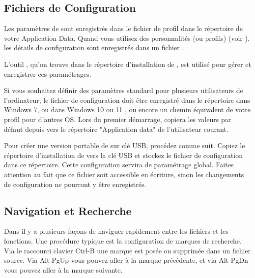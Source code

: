 
\subsection{Fichiers de Configuration}

Les paramètres de \codeblocks sont enregistrés dans le fichier de profil  dans le répertoire  de votre Application Data. Quand vous utilisez des personnalités (ou profils) (voir ), les détails de configuration sont enregistrés dans un fichier .

L'outil , qu'on trouve dans le répertoire d'installation de \codeblocks, est utilisé pour gérer et enregistrer ces paramétrages.

Si vous souhaitez définir des paramètres standard pour plusieurs utilisateurs de l'ordinateur, le fichier de configuration  doit être enregistré dans le répertoire  dans Windows 7, ou dans Windows 10 ou 11 , ou encore un chemin équivalent de votre profil pour d'autres OS. Lors du premier démarrage, \codeblocks copiera les valeurs par défaut depuis   vers le répertoire "Application data" de l'utilisateur courant.

Pour créer une version portable de \codeblocks sur clé USB, procédez comme suit. Copiez le répertoire d'installation de \codeblocks vers la clé USB et stockez le fichier de configuration  dans ce répertoire. Cette configuration servira de paramétrage global. Faites attention au fait que ce fichier soit accessible en écriture, sinon les changements de configuration ne pourront y être enregistrés.

\subsection{Navigation et Recherche}

Dans \codeblocks il y a plusieurs façons de naviguer rapidement entre les fichiers et les fonctions. Une procédure typique est la configuration de marques de recherche. Via le raccourci clavier Ctrl-B une marque est posée ou supprimée dans un fichier source. Via Alt-PgUp vous pouvez aller à la marque précédente, et via Alt-PgDn vous pouvez aller à la marque suivante.

